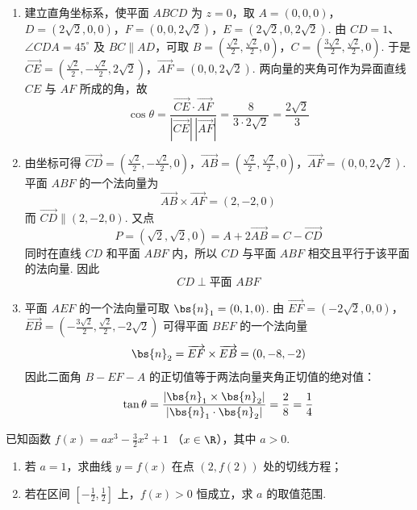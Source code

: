 \begin{solution}
\begin{enumerate}
\item 建立直角坐标系，使平面 \(ABCD\) 为 \(z=0\)，取
\(A=(0,0,0)\)，\(D=(2\sqrt2,0,0)\)，\(F=(0,0,2\sqrt2)\)，\(E=(2\sqrt2,0,2\sqrt2)\).
由 \(CD=1\)、\(\angle CDA=45^\circ\) 及 \(BC\parallel AD\)，可取
\(B=\left(\frac{\sqrt2}{2},\frac{\sqrt2}{2},0\right)\)，\(C=\left(\frac{3\sqrt2}{2},\frac{\sqrt2}{2},0\right)\).
于是
\(\overrightarrow{CE}=\left(\frac{\sqrt2}{2},-\frac{\sqrt2}{2},2\sqrt2\right)\)，\(\overrightarrow{AF}=(0,0,2\sqrt2)\).
两向量的夹角可作为异面直线 \(CE\) 与 \(AF\) 所成的角，故
\[
\cos\theta
=\frac{\overrightarrow{CE}\mathbin{\cdot}\overrightarrow{AF}}
{|\overrightarrow{CE}|\,|\overrightarrow{AF}|}
=\frac{8}{3\cdot2\sqrt2}
=\frac{2\sqrt2}{3}
\]

\item 由坐标可得
\(\overrightarrow{CD}=\left(\frac{\sqrt2}{2},-\frac{\sqrt2}{2},0\right)\)，\(\overrightarrow{AB}=\left(\frac{\sqrt2}{2},\frac{\sqrt2}{2},0\right)\)，\(\overrightarrow{AF}=(0,0,2\sqrt2)\).
平面 \(ABF\) 的一个法向量为
\[
\overrightarrow{AB}\times\overrightarrow{AF}=(2,-2,0)
\]
而 \(\overrightarrow{CD}\parallel(2,-2,0)\). 又点
\[
P=(\sqrt2,\sqrt2,0)=A+2\overrightarrow{AB}=C-\overrightarrow{CD}
\]
同时在直线 \(CD\) 和平面 \(ABF\) 内，所以 \(CD\) 与平面 \(ABF\) 相交且平行于该平面的法向量. 因此
\[
CD\perp\text{平面 }ABF
\]

\item 平面 \(AEF\) 的一个法向量可取 \(\bs{n}_1=(0,1,0)\). 由
\(\overrightarrow{EF}=(-2\sqrt2,0,0)\)，\(\overrightarrow{EB}=\left(-\frac{3\sqrt2}{2},\frac{\sqrt2}{2},-2\sqrt2\right)\)
可得平面 \(BEF\) 的一个法向量
\[
\bs{n}_2=\overrightarrow{EF}\times\overrightarrow{EB}
=(0,-8,-2)
\]
因此二面角 \(B-EF-A\) 的正切值等于两法向量夹角正切值的绝对值：
\[
\tan\theta
=\frac{|\bs{n}_1\times\bs{n}_2|}
{|\bs{n}_1\mathbin{\cdot}\bs{n}_2|}
=\frac{2}{8}
=\frac14
\]
\end{enumerate}
\end{solution}

\begin{problem}
已知函数 \(f(x) = ax^3 - \frac{3}{2}x^2 + 1\) （\(x \in \R\)），其中 \(a > 0\).

\begin{enumerate}
\item 若 \(a = 1\)，求曲线 \(y = f(x)\) 在点 \((2,f(2))\) 处的切线方程；
\item 若在区间 \(\left[-\frac{1}{2}, \frac{1}{2}\right]\) 上，\(f(x) > 0\) 恒成立，求 \(a\) 的取值范围.
\end{enumerate}
\end{problem}

